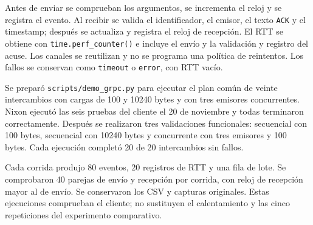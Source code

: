 Antes de enviar se comprueban los argumentos, se incrementa el reloj y se registra
el evento. Al recibir se valida el identificador, el emisor, el texto \texttt{ACK}
y el timestamp; después se actualiza y registra el reloj de recepción.
El RTT se obtiene con \texttt{time.perf\_counter()} e incluye el envío y la
validación y registro del acuse. Los canales se reutilizan y no se programa una
política de reintentos. Los fallos se conservan como \texttt{timeout} o
\texttt{error}, con RTT vacío.

Se preparó \texttt{scripts/demo\_grpc.py} para ejecutar el plan común de veinte
intercambios con cargas de 100 y 10240 bytes y con tres emisores concurrentes.
Nixon ejecutó las seis pruebas del cliente el 20 de noviembre y todas terminaron
correctamente. Después se realizaron tres validaciones funcionales: secuencial
con 100 bytes, secuencial con 10240 bytes y concurrente con tres emisores y
100 bytes. Cada ejecución completó 20 de 20 intercambios sin fallos.

Cada corrida produjo 80 eventos, 20 registros de RTT y una fila de lote. Se
comprobaron 40 parejas de envío y recepción por corrida, con reloj de recepción
mayor al de envío. Se conservaron los CSV y capturas originales. Estas ejecuciones
comprueban el cliente; no sustituyen el calentamiento y las cinco repeticiones
del experimento comparativo.
